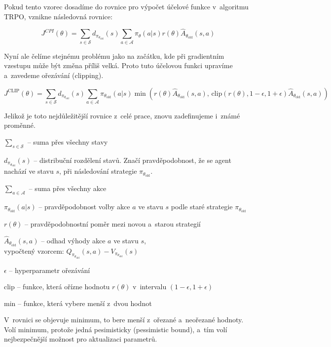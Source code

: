 Pokud tento vzorec dosadíme do rovnice pro výpočet účelové funkce v~algoritmu TRPO, vznikne následovná rovnice:

\begin{equation}
    J^{CPI}(\theta) = \sum_{s \in \mathcal{S}} d_{\pi_{\theta_{\text{old}}}}(s) \sum_{a \in \mathcal{A}} \pi_{\theta}(a \vert s) r(\theta) \hat{A}_{\theta_{\text{old}}}(s, a)
\end{equation}

Nyní ale čelíme stejnému problému jako na začátku, kde při gradientním vzestupu může být změna příliš velká.
Proto tuto účelovou funkci upravíme a~zavedeme ořezávání (clipping).

\begin{equation}
  J^{\text{CLIP}}(\theta) = \sum_{s \in \mathcal{S}} d_{\pi_{\theta_{\text{old}}}}(s) \sum_{a \in \mathcal{A}} \pi_{\theta_{\text{old}}}(a|s) \min \left( r(\theta) \hat{A}_{\theta_{\text{old}}}(s, a), \, \text{clip} \left( r(\theta), 1 - \epsilon, 1 + \epsilon \right) \hat{A}_{\theta_{\text{old}}}(s, a) \right)
\end{equation}

Jelikož je toto nejdůležitější rovnice z~celé prace, znovu zadefinujeme i~známé proměnné.
\begin{myitemize}
  \item $\sum_{s \in \mathcal{S}}$ -- suma přes všechny stavy
  \item $d_{\pi_{\theta_{\text{old}}}}(s)$ -- distribuční rozdělení stavů. Značí pravděpodobnost, že se agent nachází ve stavu $s$, při následování strategie $\pi_{\theta_{\text{old}}}$.
  \item $\sum_{a \in \mathcal{A}}$ -- suma přes všechny akce
  \item $\pi_{\theta_{\text{old}}}(a|s)$ -- pravděpodobnost volby akce $a$ ve stavu $s$ podle staré strategie $\pi_{\theta_{\text{old}}}$
  \item $r(\theta)$ -- pravděpodobnostní poměr mezi novou a~starou strategií
  \item $\hat{A}_{\theta_{\text{old}}}(s, a)$ -- odhad výhody akce $a$ ve stavu $s$,\\vypočtený vzorcem: $Q_{\pi_{\theta_{\text{old}}}}(s, a) - V_{\pi_{\theta_{\text{old}}}}(s)$
  \item $\epsilon$ -- hyperparametr ořezávání
  \item clip -- funkce, která ořízne hodnotu $r(\theta)$ v~intervalu $(1 \minus \epsilon, 1+\epsilon)$
  \item min -- funkce, která vybere menší z~dvou hodnot
\end{myitemize}
V~rovnici se objevuje minimum, to bere menší z~ořezané a~neořezané hodnoty.
Volí minimum, protože jedná pesimisticky (pessimistic bound), a~tím volí nejbezpečnější možnost pro aktualizaci parametrů.

